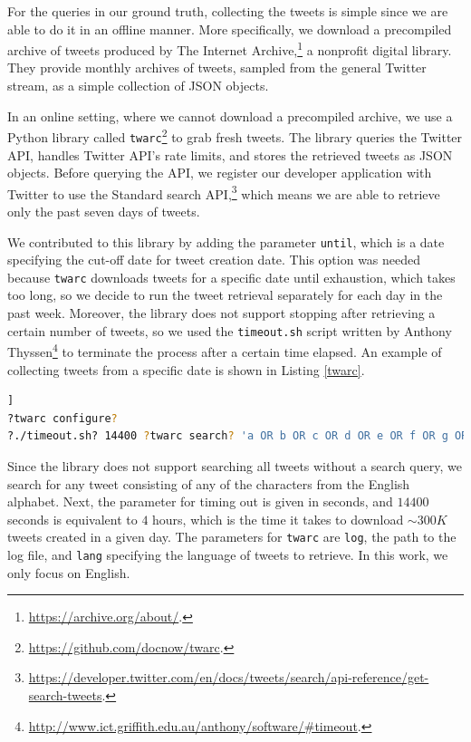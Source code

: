 For the queries in our ground truth, collecting the tweets is simple since we are able to do it in an offline manner. More specifically, we download a precompiled archive of tweets produced by The Internet Archive,\footnote{\url{https://archive.org/about/}.} a nonprofit digital library. They provide monthly archives of tweets, sampled from the general Twitter stream, as a simple collection of JSON objects.

In an online setting, where we cannot download a precompiled archive, we use a Python library called \texttt{twarc}\footnote{\url{https://github.com/docnow/twarc}.} to grab fresh tweets. The library queries the Twitter API, handles Twitter API's rate limits, and stores the retrieved tweets as JSON objects. Before querying the API, we register our developer application with Twitter to use the Standard search API,\footnote{\url{https://developer.twitter.com/en/docs/tweets/search/api-reference/get-search-tweets}.} which means we are able to retrieve only the past seven days of tweets. 

We contributed to this library by adding the parameter \texttt{until}, which is a date specifying the cut-off date for tweet creation date. This option was needed because \texttt{twarc} downloads tweets for a specific date until exhaustion, which takes too long, so we decide to run the tweet retrieval separately for each day in the past week. Moreover, the library does not support stopping after retrieving a certain number of tweets, so we used the \texttt{timeout.sh} script written by Anthony Thyssen\footnote{\url{http://www.ict.griffith.edu.au/anthony/software/#timeout}.} to terminate the process after a certain time elapsed. An example of collecting tweets from a specific date is shown in Listing \ref{twarc}.

\begin{lstlisting}[language=bash,firstnumber=1,caption=Downloading a collection of tweets for a specific date using \texttt{twarc}., label=twarc]]
?twarc configure?
?./timeout.sh? 14400 ?twarc search? 'a OR b OR c OR d OR e OR f OR g OR h OR i OR j OR k OR l OR m OR n OR o OR p OR q OR r OR s OR t OR u OR v OR w OR x OR y OR z' !--lang! en !--until! 2018-06-13 !--log! 2018-06-12.log > tweets-2018-06-12.json
\end{lstlisting}

Since the library does not support searching all tweets without a search query, we search for any tweet consisting of any of the characters from the English alphabet. Next, the parameter for timing out is given in seconds, and $14400$ seconds is equivalent to $4$ hours, which is the time it takes to download $\sim300K$ tweets created in a given day. The parameters for \texttt{twarc} are \texttt{log}, the path to the log file, and \texttt{lang} specifying the language of tweets to retrieve. In this work, we only focus on English.

